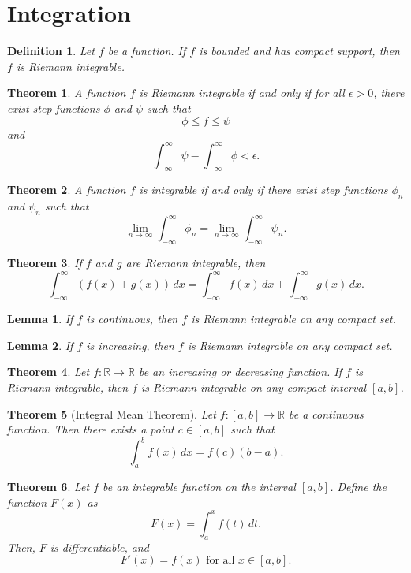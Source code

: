 \documentclass{article}
\newtheorem{definition}{Definition}
\newtheorem{lemma}{Lemma}
\newtheorem{theorem}{Theorem}
\begin{document}
\section*{Integration}
\begin{definition}
Let \( f \) be a function. If \( f \) is bounded and has compact support, then \( f \) is Riemann integrable.
\end{definition}
\begin{theorem}
A function \( f \) is Riemann integrable if and only if for all \( \epsilon > 0 \), there exist step functions \( \phi \) and \( \psi \) such that
\[
\phi \leq f \leq \psi
\]
and
\[
\int_{-\infty}^{\infty} \psi - \int_{-\infty}^{\infty} \phi < \epsilon.
\]
\end{theorem}

\begin{theorem}
A function \( f \) is integrable if and only if there exist step functions \( \phi_n \) and \( \psi_n \) such that
\[
\lim_{n \to \infty} \int_{-\infty}^{\infty} \phi_n = \lim_{n \to \infty} \int_{-\infty}^{\infty} \psi_n.
\]
\end{theorem}
\begin{theorem}
If \( f \) and \( g \) are Riemann integrable, then
\[
\int_{-\infty}^{\infty} (f(x) + g(x)) \, dx = \int_{-\infty}^{\infty} f(x) \, dx + \int_{-\infty}^{\infty} g(x) \, dx.
\]
\end{theorem}
\begin{lemma}
If \( f \) is continuous, then \( f \) is Riemann integrable on any compact set.
\end{lemma}
\begin{lemma}
If \( f \) is increasing, then \( f \) is Riemann integrable on any compact set.
\end{lemma}
\begin{theorem}
Let \( f : \mathbb{R} \to \mathbb{R} \) be an increasing or decreasing function. If \( f \) is Riemann integrable, then \( f \) is Riemann integrable on any compact interval \( [a, b] \).
\end{theorem}
\begin{theorem}[Integral Mean Theorem]
Let \( f : [a, b] \to \mathbb{R} \) be a continuous function. Then there exists a point \( c \in [a, b] \) such that
\[
\int_a^b f(x) \, dx = f(c)(b - a).
\]
\end{theorem}
\begin{theorem}
Let \( f \) be an integrable function on the interval \( [a, b] \). Define the function \( F(x) \) as
\[
F(x) = \int_a^x f(t) \, dt.
\]
Then, \( F \) is differentiable, and
\[
F'(x) = f(x) \text{ for all } x \in [a, b].
\]
\end{theorem}
\end{document}
